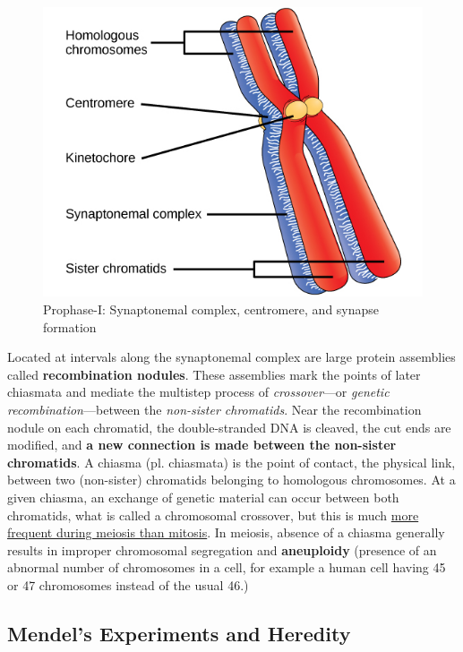 \documentclass[12pt]{article}
\begin{document}
\begin{enumerate}
\begin{figure}[h!]
    \includegraphics[scale=0.4]{synapse-formation.jpeg}
    \caption{Prophase-I: Synaptonemal complex, centromere, and synapse formation}
    \label{fig: synapse-formation}
\end{figure}
        Located at intervals along the synaptonemal complex are large protein assemblies called \textbf{recombination nodules}. These assemblies mark the points of later chiasmata and mediate the multistep process of \emph{crossover}—or \emph{genetic recombination}—between the \emph{non-sister chromatids}. Near the recombination nodule on each chromatid, the double-stranded DNA is cleaved, the cut ends are modified, and \textbf{a new connection is made between the non-sister chromatids}. A chiasma (pl. chiasmata) is the point of contact, the physical link, between two (non-sister) chromatids belonging to homologous chromosomes. At a given chiasma, an exchange of genetic material can occur between both chromatids, what is called a chromosomal crossover, but this is much \href{https://en.wikipedia.org/wiki/Chiasma_(genetics)}{more frequent during meiosis than mitosis}. In meiosis, absence of a chiasma generally results in improper chromosomal segregation and \textbf{aneuploidy} (presence of an abnormal number of chromosomes in a cell, for example a human cell having 45 or 47 chromosomes instead of the usual 46.)


\end{enumerate}


\newpage
\subsection{Mendel's Experiments and Heredity}
\end{document}
